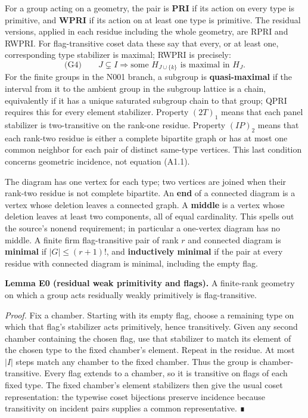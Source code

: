 \documentclass[
  10pt,
  letterpaper,
]{article}
\newcounter{none} %
\begin{document}
For a group acting on a geometry, the pair is \textbf{PRI} if its action
on every type is primitive, and \textbf{WPRI} if its action on at least
one type is primitive. The residual versions, applied in each residue
including the whole geometry, are RPRI and RWPRI. For flag-transitive
coset data these say that every, or at least one, corresponding type
stabilizer is maximal; RWPRI is precisely: \[
\text{(G4)}\qquad J\subsetneq I\Longrightarrow
 \text{some }H_{J\cup\{k\}}\text{ is maximal in }H_J.
\] For the finite groups in the N001 branch, a subgroup is
\textbf{quasi-maximal} if the interval from it to the ambient group in
the subgroup lattice is a chain, equivalently if it has a unique
saturated subgroup chain to that group; QPRI requires this for every
element stabilizer. Property \((2T)_1\) means that each panel stabilizer
is two-transitive on the rank-one residue. Property \((IP)_2\) means
that each rank-two residue is either a complete bipartite graph or has
at most one common neighbor for each pair of distinct same-type
vertices. This last condition concerns geometric incidence, not equation
(A1.1).

The diagram has one vertex for each type; two vertices are joined when
their rank-two residue is not complete bipartite. An \textbf{end} of a
connected diagram is a vertex whose deletion leaves a connected graph. A
\textbf{middle} is a vertex whose deletion leaves at least two
components, all of equal cardinality. This spells out the source's
nonend requirement; in particular a one-vertex diagram has no middle. A
finite firm flag-transitive pair of rank \(r\) and connected diagram is
\textbf{minimal} if \(|G|\leq(r+1)!\), and \textbf{inductively minimal}
if the pair at every residue with connected diagram is minimal,
including the empty flag.

\textbf{Lemma E0 (residual weak primitivity and flags).} A finite-rank
geometry on which a group acts residually weakly primitively is
flag-transitive.

\emph{Proof.} Fix a chamber. Starting with its empty flag, choose a
remaining type on which that flag's stabilizer acts primitively, hence
transitively. Given any second chamber containing the chosen flag, use
that stabilizer to match its element of the chosen type to the fixed
chamber's element. Repeat in the residue. At most \(|I|\) steps match
any chamber to the fixed chamber. Thus the group is chamber-transitive.
Every flag extends to a chamber, so it is transitive on flags of each
fixed type. The fixed chamber's element stabilizers then give the usual
coset representation: the typewise coset bijections preserve incidence
because transitivity on incident pairs supplies a common representative.
∎
\end{document}
